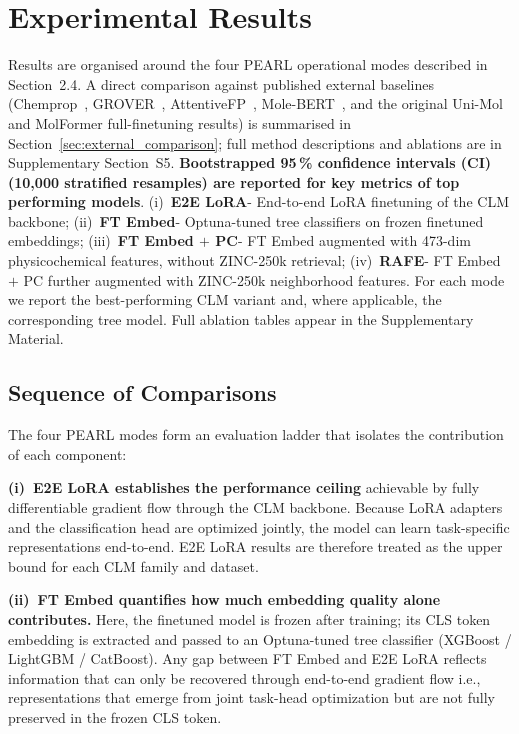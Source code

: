 \documentclass[9pt,twocolumn,conference]{IEEEtran}
\begin{document}
\section{Experimental Results}
Results are organised around the four PEARL operational modes described in Section~2.4. A direct comparison against published external baselines (Chemprop~\cite{yang2019chemprop}, GROVER~\cite{rong2020grover}, AttentiveFP~\cite{xiong2020attentivefp}, Mole-BERT~\cite{xia2023molecbert}, and the original Uni-Mol and MolFormer full-finetuning results) is summarised in Section~\ref{sec:external_comparison}; full method descriptions and ablations are in Supplementary Section~S5. \textbf{Bootstrapped 95\,\% confidence intervals (CI) (10{,}000 stratified resamples) are reported for key metrics of top performing models}.
(i)~\textbf{E2E LoRA}- End-to-end LoRA finetuning of the CLM backbone; 
(ii)~\textbf{FT Embed}- Optuna-tuned tree classifiers on frozen finetuned embeddings;
(iii)~\textbf{FT Embed $+$ PC}- FT Embed augmented with 473-dim physicochemical features, without ZINC-250k retrieval;
(iv)~\textbf{RAFE}- FT Embed $+$ PC further augmented with ZINC-250k neighborhood features. For each mode we report the best-performing CLM variant and, where applicable, the corresponding tree model. Full ablation tables appear in the Supplementary Material.
\subsection{Sequence of Comparisons}\label{sec:comparison_sequence}
The four PEARL modes form an evaluation ladder that isolates the contribution of each component:

\textbf{(i)~E2E LoRA establishes the performance ceiling} achievable by fully differentiable gradient flow through the CLM backbone.  Because LoRA adapters and the classification head are optimized jointly, the model can learn task-specific representations end-to-end. E2E LoRA results are therefore treated as the upper bound for each CLM family and dataset.

\textbf{(ii)~FT Embed quantifies how much embedding quality alone contributes.} Here, the finetuned model is frozen after training; its CLS token embedding is extracted and passed to an Optuna-tuned tree classifier (XGBoost / LightGBM / CatBoost). Any gap between FT Embed and E2E LoRA reflects information that can only be recovered through
end-to-end gradient flow i.e., representations that emerge from joint task-head optimization but are not fully preserved in the frozen CLS token.
\end{document}
